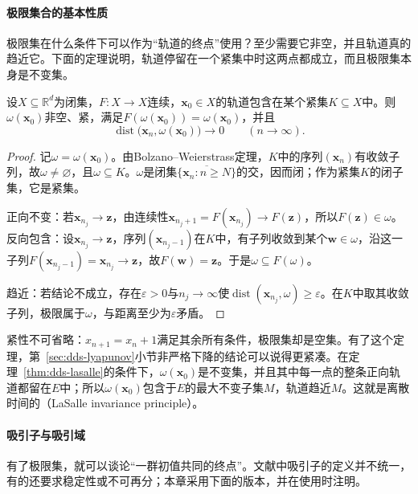 \paragraph{极限集合的基本性质}
极限集在什么条件下可以作为“轨道的终点”使用？至少需要它非空，并且轨道真的趋近它。下面的定理说明，轨道停留在一个紧集中时这两点都成立，而且极限集本身是不变集。

\begin{theorem}
\label{thm:dds-omega-limit-properties}
设$X\subseteq\mathbb R^d$为闭集，$F:X\to X$连续，$\bm x_0\in X$的轨道包含在某个紧集$K\subseteq X$中。则$\omega(\bm x_0)$非空、紧，满足$F(\omega(\bm x_0))=\omega(\bm x_0)$，并且
\[
  \operatorname{dist}\bigl(\bm x_n,\omega(\bm x_0)\bigr)\to0\qquad(n\to\infty).
\]
\end{theorem}

\begin{proof}
记$\omega=\omega(\bm x_0)$。由Bolzano--Weierstrass定理，$K$中的序列$(\bm x_n)$有收敛子列，故$\omega\neq\varnothing$，且$\omega\subseteq K$。$\omega$是闭集$\overline{\{\bm x_n:n\geq N\}}$的交，因而闭；作为紧集$K$的闭子集，它是紧集。

正向不变：若$\bm x_{n_j}\to\bm z$，由连续性$\bm x_{n_j+1}=F(\bm x_{n_j})\to F(\bm z)$，所以$F(\bm z)\in\omega$。反向包含：设$\bm x_{n_j}\to\bm z$，序列$(\bm x_{n_j-1})$在$K$中，有子列收敛到某个$\bm w\in\omega$，沿这一子列$F(\bm x_{n_j-1})=\bm x_{n_j}\to\bm z$，故$F(\bm w)=\bm z$。于是$\omega\subseteq F(\omega)$。

趋近：若结论不成立，存在$\varepsilon>0$与$n_j\to\infty$使$\operatorname{dist}(\bm x_{n_j},\omega)\geq\varepsilon$。在$K$中取其收敛子列，极限属于$\omega$，与距离至少为$\varepsilon$矛盾。
\end{proof}

紧性不可省略：$x_{n+1}=x_n+1$满足其余所有条件，极限集却是空集。有了这个定理，第~\ref{sec:dds-lyapunov}小节非严格下降的结论可以说得更紧凑。在定理~\ref{thm:dds-lasalle}的条件下，$\omega(\bm x_0)$是不变集，并且其中每一点的整条正向轨道都留在$E$中；所以$\omega(\bm x_0)$包含于$E$的最大不变子集$M$，轨道趋近$M$。这就是离散时间的（LaSalle invariance principle）。

\paragraph{吸引子与吸引域}
有了极限集，就可以谈论“一群初值共同的终点”。文献中吸引子的定义并不统一，有的还要求稳定性或不可再分；本章采用下面的版本，并在使用时注明。


